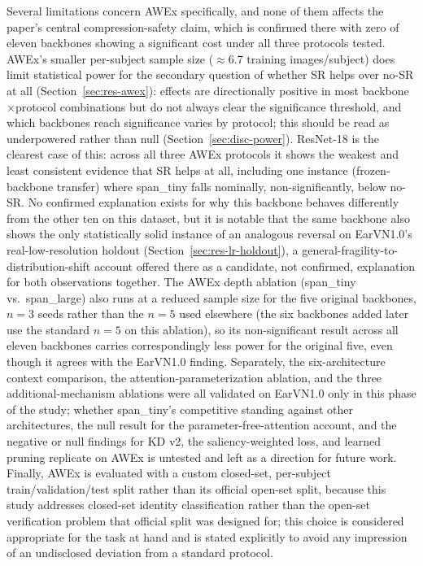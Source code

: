 \documentclass[11pt]{article}
\begin{document}
Several limitations concern AWEx specifically, and none of them affects the paper's central compression-safety claim, which is confirmed there with zero of eleven backbones showing a significant cost under all three protocols tested. AWEx's smaller per-subject sample size ($\approx$6.7 training images/subject) does limit statistical power for the secondary question of whether SR helps over no-SR at all (Section~\ref{sec:res-awex}): effects are directionally positive in most backbone$\times$protocol combinations but do not always clear the significance threshold, and which backbones reach significance varies by protocol; this should be read as underpowered rather than null (Section~\ref{sec:disc-power}). ResNet-18 is the clearest case of this: across all three AWEx protocols it shows the weakest and least consistent evidence that SR helps at all, including one instance (frozen-backbone transfer) where span\_tiny falls nominally, non-significantly, below no-SR. No confirmed explanation exists for why this backbone behaves differently from the other ten on this dataset, but it is notable that the same backbone also shows the only statistically solid instance of an analogous reversal on EarVN1.0's real-low-resolution holdout (Section~\ref{sec:res-lr-holdout}), a general-fragility-to-distribution-shift account offered there as a candidate, not confirmed, explanation for both observations together. The AWEx depth ablation (span\_tiny vs.\ span\_large) also runs at a reduced sample size for the five original backbones, $n=3$ seeds rather than the $n=5$ used elsewhere (the six backbones added later use the standard $n=5$ on this ablation), so its non-significant result across all eleven backbones carries correspondingly less power for the original five, even though it agrees with the EarVN1.0 finding. Separately, the six-architecture context comparison, the attention-parameterization ablation, and the three additional-mechanism ablations were all validated on EarVN1.0 only in this phase of the study; whether span\_tiny's competitive standing against other architectures, the null result for the parameter-free-attention account, and the negative or null findings for KD v2, the saliency-weighted loss, and learned pruning replicate on AWEx is untested and left as a direction for future work. Finally, AWEx is evaluated with a custom closed-set, per-subject train/validation/test split rather than its official open-set split, because this study addresses closed-set identity classification rather than the open-set verification problem that official split was designed for; this choice is considered appropriate for the task at hand and is stated explicitly to avoid any impression of an undisclosed deviation from a standard protocol.
\end{document}
